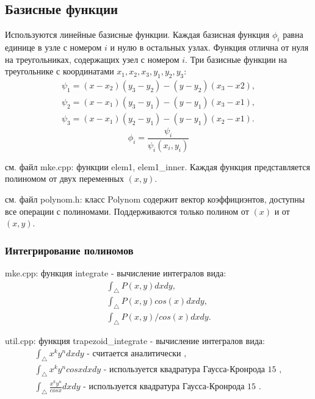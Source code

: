 \documentclass[a4paper,article]{article}
\begin{document}
\subsection{Базисные  функции}
Используются линейные базисные функции. Каждая базисная функция $\phi_i$ равна единице в узле с номером $i$ и нулю в остальных узлах. Функция отлична от нуля на треугольниках, содержащих узел с номером $i$.
Три базисные функции на треугольнике с координатами $x_1,x_2,x_3, y_1,y_2,y_3$:
\begin{equation*}
\begin{split}
\psi_1=(x-x_2)(y_3-y_2)-(y-y_2)(x_3-x2),\\
\psi_2=(x-x_1)(y_3-y_1)-(y-y_1)(x_3-x1),\\
\psi_3=(x-x_1)(y_2-y_1)-(y-y_1)(x_2-x1).
\end{split}
\end{equation*} 
\begin{equation*}
\phi_i=\frac{\psi_i}{\psi_i(x_i,y_i)}
\end{equation*}

см. файл mke.cpp: функции elem1, elem1\_inner.
Каждая функция представляется полиномом от двух переменных $(x,y)$.

см. файл polynom.h: класс Polynom содержит вектор коэффициэнтов, доступны все операции с полиномами. Поддерживаются только полином от $(x)$ и от $(x,y)$.

\subsubsection{Интегрирование  полиномов} 
mke.cpp: функция integrate - вычисление интегралов вида:
\begin{equation*}
\begin{split}
\int_\bigtriangleup P(x,y) dx dy,\\
\int_\bigtriangleup P(x,y) cos(x) dx dy,\\
\int_\bigtriangleup P(x,y) / cos(x) dx dy.
\end{split}
\end{equation*}

util.cpp: функция trapezoid\_integrate - вычисление интегралов вида:
\begin{equation*}
\begin{split}
\int_\bigtriangleup x^k y^n dx dy\text { - считается аналитически }, \\
\int_\bigtriangleup x^k y^n cos x dx dy\text{ - используется квадратура Гаусса-Кронрода 15 } ,\\
\int_\bigtriangleup \frac{x^k y^n}{cos x} dx dy\text{ - используется квадратура Гаусса-Кронрода 15 }.
\end{split}
\end{equation*}
\end{document}
